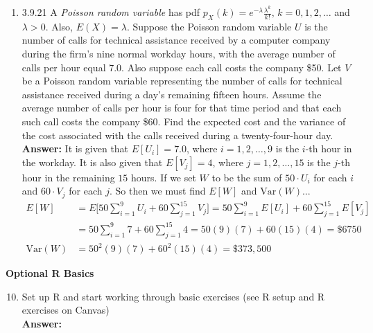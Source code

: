 \documentclass{article}
\begin{document}
\begin{enumerate}
        \item 3.9.21 A \textit{Poisson random variable} has pdf $p_X(k) = e^{-\lambda} \frac{\lambda^k}{k!}, \, k=0,1,2,\ldots$ and $\lambda > 0$. Also, $E(X) = \lambda$. Suppose the Poisson random variable $U$ is the number of calls for technical assistance received by a computer company during the firm’s nine normal workday hours, with the average number of calls per hour equal $7.0$. Also suppose each call costs the company \$50. Let $V$ be a Poisson random variable representing the number of calls for technical assistance received during a day’s remaining fifteen hours. Assume the average number of calls per hour is four for that time period and that each such call costs the company \$60. Find the expected cost and the variance of the cost associated with the calls received during a twenty-four-hour day.\\
        \textbf{Answer: }It is given that $E[U_i] = 7.0$, where $i = 1,2,\ldots , 9$ is the $i$-th hour in the workday. It is also given that $E[V_j] = 4$, where $j=1,2,\ldots ,15$ is the $j$-th hour in the remaining $15$ hours. If we set $W$ to be the sum of $50 \cdot U_i$ for each $i$ and $60 \cdot V_j$ for each $j$. So then we must find $E[W]$ and $\mathrm{Var}(W)$...
            \begin{align*}
                E[W] &= E\Bigg[50\sum_{i=1}^9 U_i + 60\sum_{j=1}^{15} V_j \Bigg] = 50\sum_{i=1}^9 E[U_i] + 60\sum_{j=1}^{15} E[V_j] \\
                &= 50\sum_{i=1}^9 7 + 60\sum_{j=1}^{15} 4 = 50(9)(7) + 60(15)(4) = \$6750\\
                \mathrm{Var}(W) &= 50^2(9)(7)+60^2(15)(4) = \$373,500
            \end{align*}
    \end{enumerate}
        
    \noindent\textbf{Optional R Basics}
    \begin{enumerate}\setcounter{enumi}{9}
        \item Set up R and start working through basic exercises (see R setup and R exercises on Canvas)\\
        \textbf{Answer: }\\
    \end{enumerate}
\end{document}
